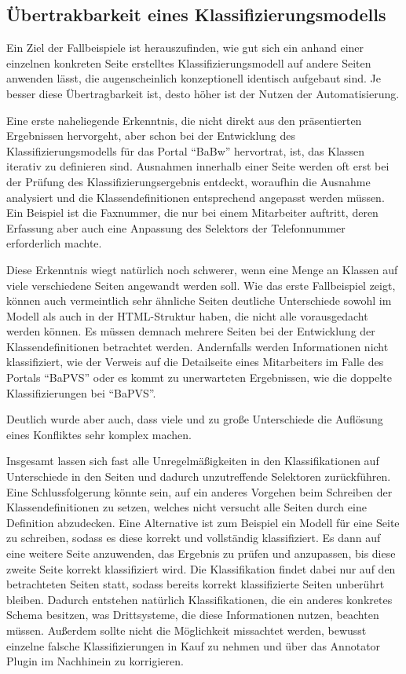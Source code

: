 \subsection{Übertrakbarkeit eines Klassifizierungsmodells}
    Ein Ziel der Fallbeispiele ist herauszufinden,
    wie gut sich ein anhand einer einzelnen konkreten Seite
    erstelltes Klassifizierungsmodell auf andere Seiten anwenden lässt,
    die augenscheinlich konzeptionell identisch aufgebaut sind.
    Je besser diese Übertragbarkeit ist,
    desto höher ist der Nutzen der Automatisierung.

    Eine erste naheliegende Erkenntnis,
    die nicht direkt aus den präsentierten Ergebnissen hervorgeht,
    aber schon bei der Entwicklung des Klassifizierungsmodells
    für das Portal "`BaBw"' hervortrat, ist,
    das Klassen iterativ zu definieren sind.
    Ausnahmen innerhalb einer Seite werden oft erst
    bei der Prüfung des Klassifizierungsergebnis entdeckt,
    woraufhin die Ausnahme analysiert und die Klassendefinitionen
    entsprechend angepasst werden müssen.
    Ein Beispiel ist die Faxnummer, die nur bei einem Mitarbeiter auftritt,
    deren Erfassung aber auch eine Anpassung des Selektors der Telefonnummer
    erforderlich machte.

    Diese Erkenntnis wiegt natürlich noch schwerer,
    wenn eine Menge an Klassen auf viele verschiedene Seiten angewandt werden soll.
    Wie das erste Fallbeispiel zeigt,
    können auch vermeintlich sehr ähnliche Seiten deutliche Unterschiede
    sowohl im Modell als auch in der HTML-Struktur haben,
    die nicht alle vorausgedacht werden können.
    Es müssen demnach mehrere Seiten bei der Entwicklung der Klassendefinitionen
    betrachtet werden.
    Andernfalls werden Informationen nicht klassifiziert,
    wie der Verweis auf die Detailseite eines Mitarbeiters im Falle des
    Portals "`BaPVS"' oder es kommt zu unerwarteten Ergebnissen,
    wie die doppelte Klassifizierungen bei "`BaPVS"'.

    Deutlich wurde aber auch, dass viele und zu große Unterschiede
    die Auflösung eines Konfliktes sehr komplex machen.

    Insgesamt lassen sich fast alle Unregelmäßigkeiten in den Klassifikationen
    auf Unterschiede in den Seiten und dadurch unzutreffende Selektoren zurückführen.
    Eine Schlussfolgerung könnte sein, auf ein anderes Vorgehen beim
    Schreiben der Klassendefinitionen zu setzen,
    welches nicht versucht alle Seiten durch eine Definition abzudecken.
    Eine Alternative ist zum Beispiel ein Modell für eine Seite zu schreiben,
    sodass es diese korrekt und vollständig klassifiziert.
    Es dann auf eine weitere Seite anzuwenden,
    das Ergebnis zu prüfen und anzupassen,
    bis diese zweite Seite korrekt klassifiziert wird.
    Die Klassifikation findet dabei nur auf den betrachteten Seiten statt,
    sodass bereits korrekt klassifizierte Seiten unberührt bleiben.
    Dadurch entstehen natürlich Klassifikationen,
    die ein anderes konkretes Schema besitzen,
    was Drittsysteme, die diese Informationen nutzen,
    beachten müssen.
    Außerdem sollte nicht die Möglichkeit missachtet werden,
    bewusst einzelne falsche Klassifizierungen in Kauf zu nehmen
    und über das Annotator Plugin im Nachhinein zu korrigieren.

